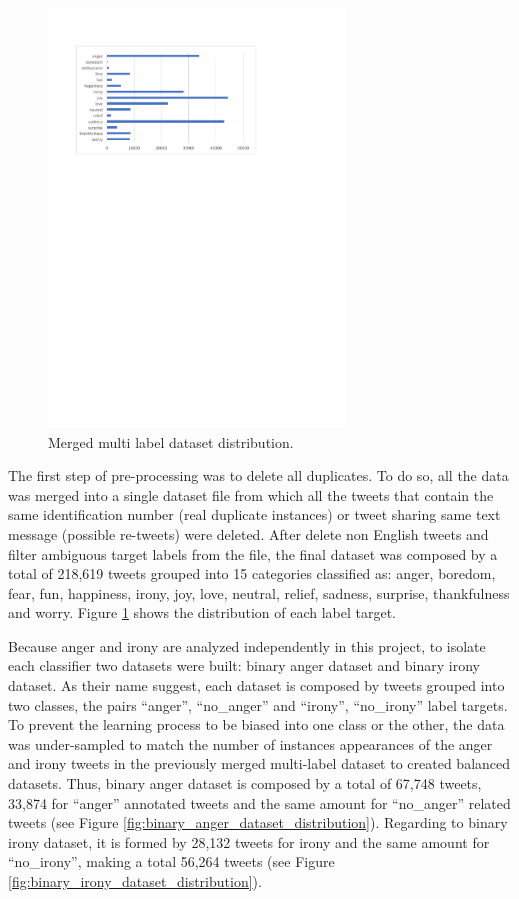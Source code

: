 \begin{figure}[!htp]
  \center
  \includegraphics[width=0.7\textwidth]{figures/merged_multilabel_dataset_distribution}
  \caption{Merged multi label dataset distribution.}
  \label{fig:merged_multilabel_dataset_distribution}
\end{figure}

The first step of pre-processing was to delete all duplicates. To do so, all the data was merged into a single dataset file from which all the tweets that contain the same identification number (real duplicate instances) or tweet sharing same text message (possible re-tweets) were deleted. After delete non English tweets and filter ambiguous target labels from the file, the final dataset was composed by a total of 218,619 tweets grouped into 15 categories classified as: anger, boredom, fear, fun, happiness, irony, joy, love, neutral, relief, sadness, surprise, thankfulness and worry. Figure \ref{fig:merged_multilabel_dataset_distribution} shows the distribution of each label target.

Because anger and irony are analyzed independently in this project, to isolate each classifier two datasets were built: binary anger dataset and binary irony dataset. As their name suggest, each dataset is composed by tweets grouped into two classes, the pairs ``anger'', ``no\_anger'' and ``irony'', ``no\_irony'' label targets. To prevent the learning process to be biased into one class or the other, the data was under-sampled to match the number of instances appearances of the anger and irony tweets in the previously merged multi-label dataset to created balanced datasets. Thus, binary anger dataset is composed by a total of 67,748 tweets, 33,874 for ``anger'' annotated tweets and the same amount for ``no\_anger'' related tweets (see Figure \ref{fig:binary_anger_dataset_distribution}). Regarding to binary irony dataset, it is formed by 28,132 tweets for irony and the same amount for ``no\_irony'', making a total 56,264 tweets (see Figure \ref{fig:binary_irony_dataset_distribution}).

